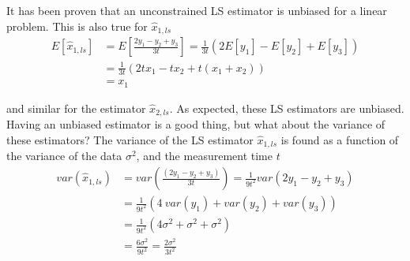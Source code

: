 \documentclass[report,12pt]{report}
\begin{document}
It has been proven that an unconstrained LS estimator is unbiased for a linear problem. This is also true for $\hat x_{1, ls}$
\begin{align}
	E[\hat x_{1, ls}] 
	&= E\left[ \frac{2 y_1 - y_2 + y_3}{3t} \right]
	= \frac{1}{3t}\left( 2 E[y_1] - E[y_2] + E[y_3] \right)
	\nonumber\\
	&=\frac{1}{3t} \left( 2 t x_1 - t x_2 + t(x_1 + x_2) \right)
	\nonumber\\
	&= x_1
	\label{eq:biasnormalestimator}
\end{align}

and similar for the estimator $\hat x_{2, ls }$. As expected, these LS estimators are unbiased.\\

Having an unbiased estimator is a good thing, but what about the variance of these estimators? The variance of the LS estimator $\hat x_{1, ls}$ is found as a function of the variance of the data $\sigma^2$, and the measurement time $t$
\begin{align}
	var(\hat x_{1, ls}) 
	&= var\left(\frac{(2 y_1 - y_2 + y_3)}{3t}\right)
	= \frac{1}{9t^2}var\left(
	2y_1 - y_2 + y_3\right)
	\nonumber\\
	&= \frac{1}{9t^2}\left(
	4\ var(y_1) + var(y_2) + var(y_3)\right)
	\nonumber\\
	&= \frac{1}{9t^2}\left(
	4 \sigma^2 + \sigma^2 + \sigma^2\right)
	\nonumber\\
	&= \frac{6 \sigma^2}{9t^2} = \frac{2 \sigma^2}{3 t^2}
	\label{eq:varLS}
\end{align}
\end{document}
